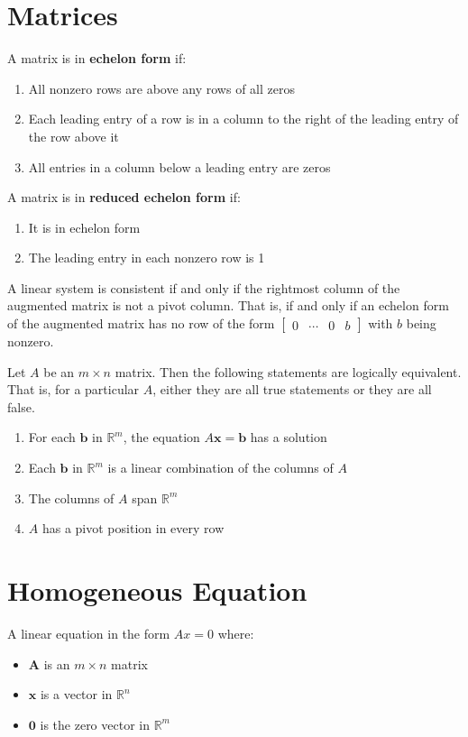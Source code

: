 \documentclass{article}
\begin{document}
\section*{Matrices}

A matrix is in \textbf{echelon form} if:
\begin{enumerate}
    \item All nonzero rows are above any rows of all zeros
    \item Each leading entry of a row is in a column to the right of the leading entry of the row
    above it
    \item All entries in a column below a leading entry are zeros
\end{enumerate}

\noindent
A matrix is in \textbf{reduced echelon form} if:
\begin{enumerate}
    \item It is in echelon form
    \item The leading entry in each nonzero row is 1
\end{enumerate}

\noindent
A linear system is consistent if and only if the rightmost column of the augmented matrix is not a
pivot column. That is, if and only if an echelon form of the augmented matrix has no row of the
form $\begin{bmatrix} 0 & \cdots & 0 & b \end{bmatrix}$ with $b$ being nonzero.


Let $A$ be an $m \times n$ matrix. Then the following statements are logically equivalent. That is, for a particular $A$, either they are all true statements or they are all false.
\begin{enumerate}
    \item For each $\textbf{b}$ in $\mathbb{R}^m$, the equation $A\mathbf{x}=\mathbf{b}$ has a solution
    \item Each $\textbf{b}$ in $\mathbb{R}^m$ is a linear combination of the columns of $A$
    \item The columns of $A$ span $\mathbb{R}^m$
    \item $A$ has a pivot position in every row
\end{enumerate}

\section*{Homogeneous Equation}
A linear equation in the form $Ax=0$ where:
\begin{itemize}
    \item $\textbf{A}$ is an $m\times n$ matrix
    \item $\textbf{x}$ is a vector in $\mathbb{R}^n$
    \item $\textbf{0}$ is the zero vector in $\mathbb{R}^m$
\end{itemize}
\end{document}
